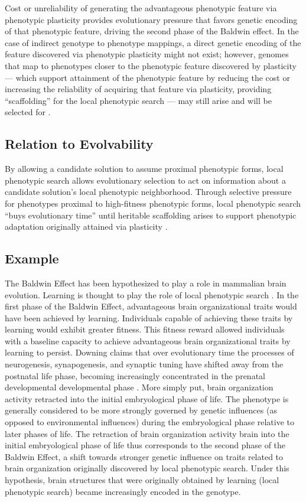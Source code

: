 Cost or unreliability of generating the advantageous phenotypic feature via phenotypic plasticity provides evolutionary pressure that favors genetic encoding of that phenotypic feature, driving the second phase of the Baldwin effect.
In the case of indirect genotype to phenotype mappings, a direct genetic encoding of the feature discovered via phenotypic plasticity might not exist; however, genomes that map to phenotypes closer to the phenotypic feature discovered by plasticity --- which support attainment of the phenotypic feature by reducing the cost or increasing the reliability of acquiring that feature via plasticity, providing ``scaffolding'' for the local phenotypic search --- may still arise and will be selected for \cite{Downing2012HeterochronousBaldwinism}.


\subsection{Relation to Evolvability}
By allowing a candidate solution to assume proximal phenotypic forms, local phenotypic search allows evolutionary selection to act on information about a candidate solution's local phenotypic neighborhood.
Through selective pressure for phenotypes proximal to high-fitness phenotypic forms, local phenotypic search ``buys evolutionary time'' until heritable scaffolding arises to support phenotypic adaptation originally attained via plasticity \cite{Downing2010TheNetworks}.

\subsection{Example}
The Baldwin Effect has been hypothesized to play a role in mammalian brain evolution.
Learning is thought to play the role of local phenotypic search \cite{Downing2010TheNetworks}.
In the first phase of the Baldwin Effect, advantageous brain organizational traits would have been achieved by learning.
Individuals capable of achieving these traits by learning would exhibit greater fitness.
This fitness reward allowed individuals with a baseline capacity to achieve advantageous brain organizational traits by learning to persist.
Downing claims that over evolutionary time the processes of neurogenesis, synapogenesis, and synaptic tuning have shifted away from the postnatal life phase, becoming increasingly concentrated in the prenatal developmental developmental phase \cite{Downing2012HeterochronousBaldwinism}.
More simply put, brain organization activity retracted into the initial embryological phase of life.
The phenotype is generally considered to be more strongly governed by genetic influences (as opposed to environmental influences) during the embryological phase relative to later phases of life.
The retraction of brain organization activity brain into the initial embryological phase of life thus corresponds to the second phase of the Baldwin Effect, a shift towards stronger genetic influence on traits related to brain organization originally discovered by local phenotypic search.
Under this hypothesis, brain structures that were originally obtained by learning (local phenotypic search) became increasingly encoded in the genotype.

